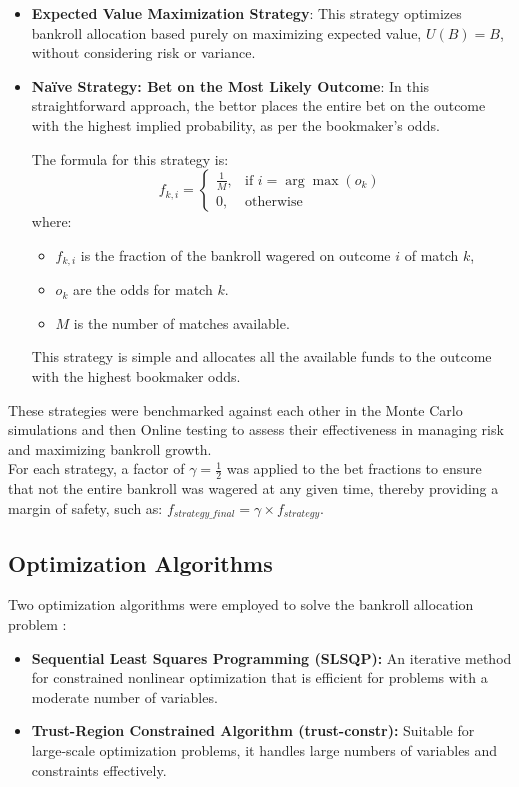 \begin{itemize}
    \item \textbf{Expected Value Maximization Strategy}:  
    This strategy optimizes bankroll allocation based purely on maximizing expected value, \(U(B) = B\), without considering risk or variance.

    \item \textbf{Naïve Strategy: Bet on the Most Likely Outcome}:  
    In this straightforward approach, the bettor places the entire bet on the outcome with the highest implied probability, as per the bookmaker's odds.
    
    The formula for this strategy is:
    \[
    f_{k,i} = 
    \begin{cases}
    \frac{1}{M}, & \text{if } i = \arg\max(o_k) \\
    0, & \text{otherwise}
    \end{cases}
    \]
    where:
    \begin{itemize}
        \item \( f_{k,i} \) is the fraction of the bankroll wagered on outcome \( i \) of match \( k \),
        \item \( o_k \) are the odds for match \( k \).
        \item \(M\) is the number of matches available.
    \end{itemize}
    This strategy is simple and allocates all the available funds to the outcome with the highest bookmaker odds.
\end{itemize}

These strategies were benchmarked against each other in the Monte Carlo simulations and then Online testing to assess their effectiveness in managing risk and maximizing bankroll growth. \\

For each strategy, a factor of \( \gamma = \frac{1}{2} \) was applied to the bet fractions to ensure that not the entire bankroll was wagered at any given time, thereby providing a margin of safety, such as: \(f_{strategy\_final} = \gamma \times f_{strategy}\).


\subsection{Optimization Algorithms}

Two optimization algorithms were employed to solve the bankroll allocation problem \cite{BoydVandenberghe2004}:

\begin{itemize}
    \item \textbf{Sequential Least Squares Programming (SLSQP):} An iterative method for constrained nonlinear optimization that is efficient for problems with a moderate number of variables.
    \item \textbf{Trust-Region Constrained Algorithm (trust-constr):} Suitable for large-scale optimization problems, it handles large numbers of variables and constraints effectively.
\end{itemize}

